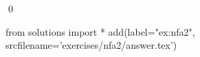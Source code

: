
\begin{ex} 
  \label{ex:nfa2}
  
  \qed
\end{ex} 
\begin{python0}
from solutions import *
add(label="ex:nfa2",
    srcfilename='exercises/nfa2/answer.tex') 
\end{python0}
